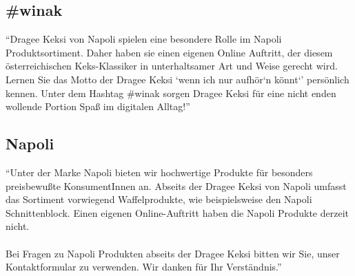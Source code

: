 \subsection{\#winak}
\enquote{Dragee Keksi von Napoli spielen eine besondere Rolle im Napoli Produktsortiment. Daher haben sie einen eigenen Online Auftritt, der diesem österreichischen Keks-Klassiker in unterhaltsamer Art und Weise gerecht wird.
Lernen Sie das Motto der Dragee Keksi \enquote{wenn ich nur aufhör`n könnt`} persönlich kennen. Unter dem Hashtag \#winak sorgen Dragee Keksi für eine nicht enden wollende Portion Spaß im digitalen Alltag!}\cite{josef_manner_marken}

\subsection{Napoli}
\enquote{Unter der Marke Napoli bieten wir hochwertige Produkte für besonders preisbewußte KonsumentInnen an. Abseits der Dragee Keksi von Napoli umfasst das Sortiment vorwiegend Waffelprodukte, wie beispielsweise den Napoli Schnittenblock. Einen eigenen Online-Auftritt haben die Napoli Produkte derzeit nicht.\\\\
Bei Fragen zu Napoli Produkten abseits der Dragee Keksi bitten wir Sie, unser Kontaktformular zu verwenden. Wir danken für Ihr Verständnis.}\cite{josef_manner_marken}
